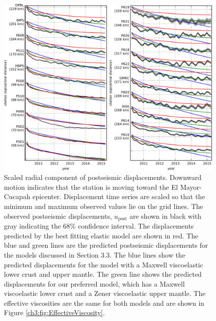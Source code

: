 \begin{figure}
\includegraphics[scale=1.0]{ch3/figures/2016jb013114-p07}
\caption{Scaled radial component of postseismic displacements. Downward motion indicates that the station is moving toward the El Mayor-Cucapah epicenter.  Displacement time series are scaled so that the minimum and maximum observed values lie on the grid lines.  The observed postseismic displacements, $u_\mathrm{post}$ are shown in black with gray indicating the 68\% confidence interval.  The displacements predicted by the best fitting elastic model are shown in red.  The blue and green lines are the predicted postseismic displacements for the models discussed in Section 3.3. The blue lines show the predicted displacements for the model with a Maxwell viscoelastic lower crust and upper mantle.  The green line shows the predicted displacements for our preferred model, which has a Maxwell viscoelastic lower crust and a Zener viscoelastic upper mantle.  The effective viscosities are the same for both models and are shown in Figure \ref{ch3:fig:EffectiveViscosity}.}
\label{ch3:fig:RecordSectionMain}
\end{figure}

